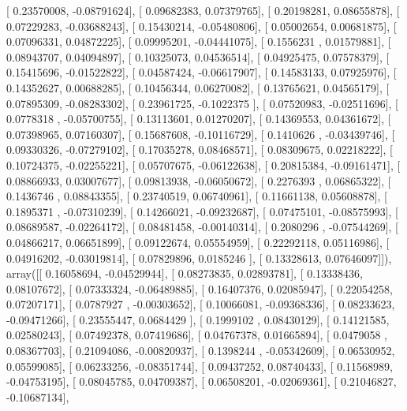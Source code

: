 \documentclass{article}
\begin{document}
       [ 0.23570008, -0.08791624],
       [ 0.09682383,  0.07379765],
       [ 0.20198281,  0.08655878],
       [ 0.07229283, -0.03688243],
       [ 0.15430214, -0.05480806],
       [ 0.05002654,  0.00681875],
       [ 0.07096331,  0.04872225],
       [ 0.09995201, -0.04441075],
       [ 0.1556231 ,  0.01579881],
       [ 0.08943707,  0.04094897],
       [ 0.10325073,  0.04536514],
       [ 0.04925475,  0.07578379],
       [ 0.15415696, -0.01522822],
       [ 0.04587424, -0.06617907],
       [ 0.14583133,  0.07925976],
       [ 0.14352627,  0.00688285],
       [ 0.10456344,  0.06270082],
       [ 0.13765621,  0.04565179],
       [ 0.07895309, -0.08283302],
       [ 0.23961725, -0.1022375 ],
       [ 0.07520983, -0.02511696],
       [ 0.0778318 , -0.05700755],
       [ 0.13113601,  0.01270207],
       [ 0.14369553,  0.04361672],
       [ 0.07398965,  0.07160307],
       [ 0.15687608, -0.10116729],
       [ 0.1410626 , -0.03439746],
       [ 0.09330326, -0.07279102],
       [ 0.17035278,  0.08468571],
       [ 0.08309675,  0.02218222],
       [ 0.10724375, -0.02255221],
       [ 0.05707675, -0.06122638],
       [ 0.20815384, -0.09161471],
       [ 0.08866933,  0.03007677],
       [ 0.09813938, -0.06050672],
       [ 0.2276393 ,  0.06865322],
       [ 0.1436746 ,  0.08843355],
       [ 0.23740519,  0.06740961],
       [ 0.11661138,  0.05608878],
       [ 0.1895371 , -0.07310239],
       [ 0.14266021, -0.09232687],
       [ 0.07475101, -0.08575993],
       [ 0.08689587, -0.02264172],
       [ 0.08481458, -0.00140314],
       [ 0.2080296 , -0.07544269],
       [ 0.04866217,  0.06651899],
       [ 0.09122674,  0.05554959],
       [ 0.22292118,  0.05116986],
       [ 0.04916202, -0.03019814],
       [ 0.07829896,  0.0185246 ],
       [ 0.13328613,  0.07646097]]), array([[ 0.16058694, -0.04529944],
       [ 0.08273835,  0.02893781],
       [ 0.13338436,  0.08107672],
       [ 0.07333324, -0.06489885],
       [ 0.16407376,  0.02085947],
       [ 0.22054258,  0.07207171],
       [ 0.0787927 , -0.00303652],
       [ 0.10066081, -0.09368336],
       [ 0.08233623, -0.09471266],
       [ 0.23555447,  0.0684429 ],
       [ 0.1999102 ,  0.08430129],
       [ 0.14121585,  0.02580243],
       [ 0.07492378,  0.07419686],
       [ 0.04767378,  0.01665894],
       [ 0.0479058 ,  0.08367703],
       [ 0.21094086, -0.00820937],
       [ 0.1398244 , -0.05342609],
       [ 0.06530952,  0.05599085],
       [ 0.06233256, -0.08351744],
       [ 0.09437252,  0.08740433],
       [ 0.11568989, -0.04753195],
       [ 0.08045785,  0.04709387],
       [ 0.06508201, -0.02069361],
       [ 0.21046827, -0.10687134],
\end{document}
